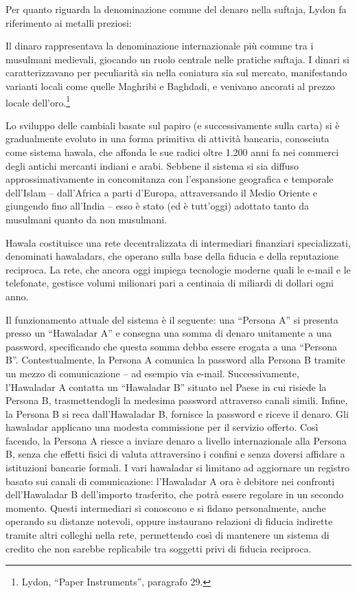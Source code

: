 \documentclass[
  a5paper,
  smalldemyvopaper,10pt,twoside,onecolumn,openright,extrafontsizes,hidelinks]{memoir}
\begin{document}
Per quanto riguarda la denominazione comune del denaro nella suftaja,
Lydon fa riferimento ai metalli preziosi:

Il dinaro rappresentava la denominazione internazionale più comune tra i
musulmani medievali, giocando un ruolo centrale nelle pratiche suftaja.
I dinari si caratterizzavano per peculiarità sia nella coniatura sia sul
mercato, manifestando varianti locali come quelle Maghribi e Baghdadi, e
venivano ancorati al prezzo locale dell'oro.\footnote{Lydon, ``Paper
  Instruments'', paragrafo 29.}

Lo sviluppo delle cambiali basate sul papiro (e successivamente sulla
carta) si è gradualmente evoluto in una forma primitiva di attività
bancaria, conosciuta come sistema hawala, che affonda le sue radici
oltre 1.200 anni fa nei commerci degli antichi mercanti indiani e arabi.
Sebbene il sistema si sia diffuso approssimativamente in concomitanza
con l'espansione geografica e temporale dell'Islam -- dall'Africa a
parti d'Europa, attraversando il Medio Oriente e giungendo fino
all'India -- esso è stato (ed è tutt'oggi) adottato tanto da musulmani
quanto da non musulmani.

Hawala costituisce una rete decentralizzata di intermediari finanziari
specializzati, denominati hawaladars, che operano sulla base della
fiducia e della reputazione reciproca. La rete, che ancora oggi impiega
tecnologie moderne quali le e-mail e le telefonate, gestisce volumi
milionari pari a centinaia di miliardi di dollari ogni anno.

Il funzionamento attuale del sistema è il seguente: una ``Persona A'' si
presenta presso un ``Hawaladar A'' e consegna una somma di denaro
unitamente a una password, specificando che questa somma debba essere
erogata a una ``Persona B''. Contestualmente, la Persona A comunica la
password alla Persona B tramite un mezzo di comunicazione -- ad esempio
via e-mail. Successivamente, l'Hawaladar A contatta un ``Hawaladar B''
situato nel Paese in cui risiede la Persona B, trasmettendogli la
medesima password attraverso canali simili. Infine, la Persona B si reca
dall'Hawaladar B, fornisce la password e riceve il denaro. Gli hawaladar
applicano una modesta commissione per il servizio offerto. Così facendo,
la Persona A riesce a inviare denaro a livello internazionale alla
Persona B, senza che effetti fisici di valuta attraversino i confini e
senza doversi affidare a istituzioni bancarie formali. I vari hawaladar
si limitano ad aggiornare un registro basato sui canali di
comunicazione: l'Hawaladar A ora è debitore nei confronti dell'Hawaladar
B dell'importo trasferito, che potrà essere regolare in un secondo
momento. Questi intermediari si conoscono e si fidano personalmente,
anche operando su distanze notevoli, oppure instaurano relazioni di
fiducia indirette tramite altri colleghi nella rete, permettendo così di
mantenere un sistema di credito che non sarebbe replicabile tra soggetti
privi di fiducia reciproca.
\end{document}
